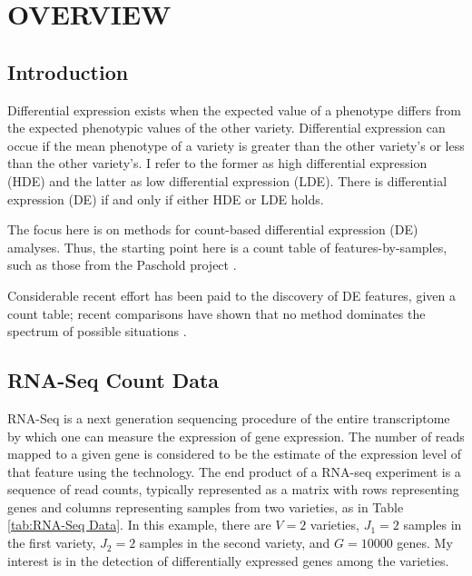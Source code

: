 \chapter{OVERVIEW}



\section{Introduction}

Differential expression exists when the expected value of a phenotype differs from the expected phenotypic values of the other variety. Differential expression can occue if the mean phenotype of a variety is greater than the other variety's or less than the other variety's. I refer to the former as high differential expression (HDE) and the latter as low differential expression (LDE). There is differential expression (DE) if and only if either HDE or LDE holds.

The focus here is on methods for count-based differential expression (DE) amalyses. Thus, the starting point here is a count table of features-by-samples, such as those from the Paschold project \cite{paschold2012complementation}.

Considerable recent effort has been paid to the discovery of DE features, given a count table; recent comparisons have shown that no method dominates the spectrum of possible situations \cite{soneson2013comparison}\cite{rapaport2013comprehensive}. 

\section{RNA-Seq Count Data}

RNA-Seq is a next generation sequencing procedure of the entire transcriptome by which one can measure the expression of gene expression. The number of reads mapped to a given gene is considered to be the estimate of the expression level of that feature using the technology. The end product of a RNA-seq experiment is a sequence of read counts, typically represented as a matrix with rows representing genes and columns representing samples from two varieties, as in Table \ref{tab:RNA-Seq Data}. In this example, there are $V=2$ varieties, $J_1 = 2$ samples in the first variety, $J_2=2$ samples in the second variety, and $G=10000$ genes. My interest is in the detection of differentially expressed genes among the varieties. 

